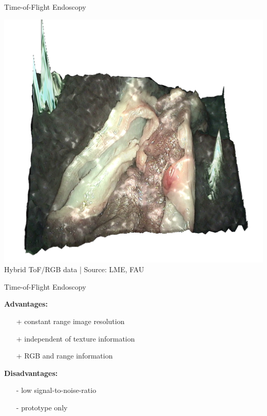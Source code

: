 \begin{frame}[c]{Time-of-Flight Endoscopy}

	\begin{center}
		\includegraphics[height=.8\textheight ]{images/tof1}\\
		\scriptsize Hybrid ToF/RGB data | Source: LME, FAU
	\end{center}

\end{frame}



\begin{frame}{Time-of-Flight Endoscopy}

	\textbf{Advantages:}
	\begin{itemize}
		\item[+] constant range image resolution
		\item[+] independent of texture information
		\item[+] RGB and range information
	\end{itemize}
	\vspace{1em}
	\textbf{Disadvantages:}
	\begin{itemize}
		\item[-] low signal-to-noise-ratio
		\item[-] prototype only
	\end{itemize}

\end{frame}


